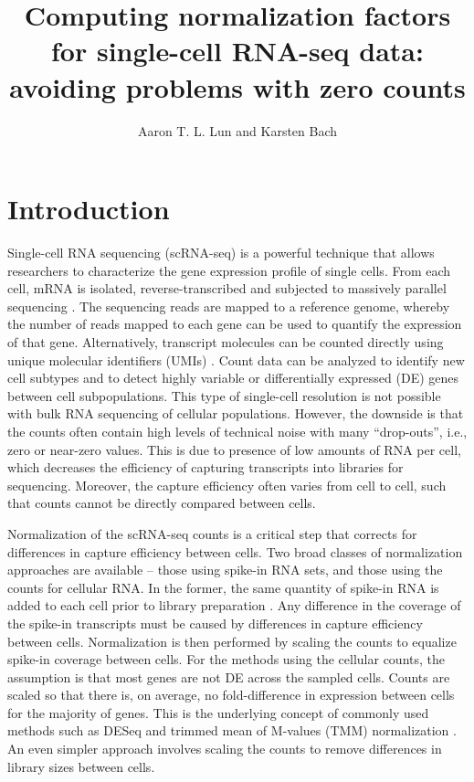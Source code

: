 \documentclass{article}
\title{Computing normalization factors for single-cell RNA-seq data: avoiding problems with zero counts}
\author{Aaron T. L. Lun and Karsten Bach}
\begin{document}
\maketitle

\newcommand{\suppdeconv}{1}
\newcommand{\suppspikesec}{2}

\newcommand{\suppring}{S1}
\newcommand{\suppspikefig}{S2}

\newcommand{\supprank}{S1}
\newcommand{\suppHVG}{S2}

\section{Introduction}
Single-cell RNA sequencing (scRNA-seq) is a powerful technique that allows researchers to characterize the gene expression profile of single cells.
From each cell, mRNA is isolated, reverse-transcribed and subjected to massively parallel sequencing \cite{stegle2015computational}.
The sequencing reads are mapped to a reference genome, whereby the number of reads mapped to each gene can be used to quantify the expression of that gene.
Alternatively, transcript molecules can be counted directly using unique molecular identifiers (UMIs) \cite{islam2014quantitative}.
Count data can be analyzed to identify new cell subtypes and to detect highly variable or differentially expressed (DE) genes between cell subpopulations.
This type of single-cell resolution is not possible with bulk RNA sequencing of cellular populations.
However, the downside is that the counts often contain high levels of technical noise with many ``drop-outs'', i.e., zero or near-zero values.
This is due to presence of low amounts of RNA per cell, which decreases the efficiency of capturing transcripts into libraries for sequencing.
Moreover, the capture efficiency often varies from cell to cell, such that counts cannot be directly compared between cells.

Normalization of the scRNA-seq counts is a critical step that corrects for differences in capture efficiency between cells.
Two broad classes of normalization approaches are available -- those using spike-in RNA sets, and those using the counts for cellular RNA.
In the former, the same quantity of spike-in RNA is added to each cell prior to library preparation \cite{stegle2015computational}.
Any difference in the coverage of the spike-in transcripts must be caused by differences in capture efficiency between cells.
Normalization is then performed by scaling the counts to equalize spike-in coverage between cells.
For the methods using the cellular counts, the assumption is that most genes are not DE across the sampled cells.
Counts are scaled so that there is, on average, no fold-difference in expression between cells for the majority of genes.
This is the underlying concept of commonly used methods such as DESeq \cite{anders2010differential} and trimmed mean of M-values (TMM) normalization \cite{robinson2010scaling}.
An even simpler approach involves scaling the counts to remove differences in library sizes between cells.
\end{document}
